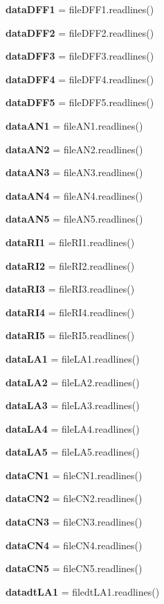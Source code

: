 \begin{DoxyCompactItemize}
\item 
\textbf{ data\+D\+F\+F1} = file\+D\+F\+F1.\+readlines()
\item 
\textbf{ data\+D\+F\+F2} = file\+D\+F\+F2.\+readlines()
\item 
\textbf{ data\+D\+F\+F3} = file\+D\+F\+F3.\+readlines()
\item 
\textbf{ data\+D\+F\+F4} = file\+D\+F\+F4.\+readlines()
\item 
\textbf{ data\+D\+F\+F5} = file\+D\+F\+F5.\+readlines()
\item 
\textbf{ data\+A\+N1} = file\+A\+N1.\+readlines()
\item 
\textbf{ data\+A\+N2} = file\+A\+N2.\+readlines()
\item 
\textbf{ data\+A\+N3} = file\+A\+N3.\+readlines()
\item 
\textbf{ data\+A\+N4} = file\+A\+N4.\+readlines()
\item 
\textbf{ data\+A\+N5} = file\+A\+N5.\+readlines()
\item 
\textbf{ data\+R\+I1} = file\+R\+I1.\+readlines()
\item 
\textbf{ data\+R\+I2} = file\+R\+I2.\+readlines()
\item 
\textbf{ data\+R\+I3} = file\+R\+I3.\+readlines()
\item 
\textbf{ data\+R\+I4} = file\+R\+I4.\+readlines()
\item 
\textbf{ data\+R\+I5} = file\+R\+I5.\+readlines()
\item 
\textbf{ data\+L\+A1} = file\+L\+A1.\+readlines()
\item 
\textbf{ data\+L\+A2} = file\+L\+A2.\+readlines()
\item 
\textbf{ data\+L\+A3} = file\+L\+A3.\+readlines()
\item 
\textbf{ data\+L\+A4} = file\+L\+A4.\+readlines()
\item 
\textbf{ data\+L\+A5} = file\+L\+A5.\+readlines()
\item 
\textbf{ data\+C\+N1} = file\+C\+N1.\+readlines()
\item 
\textbf{ data\+C\+N2} = file\+C\+N2.\+readlines()
\item 
\textbf{ data\+C\+N3} = file\+C\+N3.\+readlines()
\item 
\textbf{ data\+C\+N4} = file\+C\+N4.\+readlines()
\item 
\textbf{ data\+C\+N5} = file\+C\+N5.\+readlines()
\item 
\textbf{ datadt\+L\+A1} = filedt\+L\+A1.\+readlines()
\item 

\end{DoxyCompactItemize}
